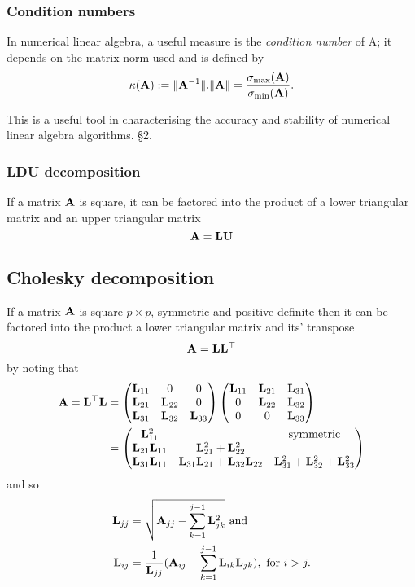 \documentclass{amsart}[12pt]
\begin{document}
\subsubsection{Condition numbers}
In numerical linear algebra, a useful measure is the \emph{condition number} of A; it depends on the matrix
norm used and is defined by
\[
	\kappa({\bf A}) := \|{\bf A}^{-1}\|.\|{\bf A}\| = \frac{\sigma_{\text{max}}({\bf A})}{\sigma_{\text{min}}({\bf A})}.
\]

This is a useful tool in characterising the accuracy and stability of numerical linear algebra algorithms.
\cite{Golub:1996:MC:248979} \S 2.

\subsubsection{LDU decomposition}

If a matrix ${\bf A}$ is square, it can be factored into the product of a lower triangular matrix and an upper 
triangular matrix
\[
	{\bf A} = {\bf L} {\bf U}
\]

\subsection{Cholesky decomposition}

If a matrix ${\bf A}$ is square $p \times p$, symmetric and positive definite then it can be factored into the
product a lower triangular matrix and its' transpose
\[
	{\bf A} = {\bf L} {\bf L}^\top
\]
by noting that
\begin{align*}
	{\bf A} = {\bf L}^\top {\bf L} &= \begin{pmatrix}
		{\bf L}_{11} & 0 & 0 \\
		{\bf L}_{21} & {\bf L}_{22} & 0 \\
		{\bf L}_{31} & {\bf L}_{32} & {\bf L}_{33}
	\end{pmatrix}
	\begin{pmatrix}
		{\bf L}_{11} & {\bf L}_{21} & {\bf L}_{31} \\
		0 & {\bf L}_{22} & {\bf L}_{32} \\
		0 & 0 & {\bf L}_{33}
	\end{pmatrix}	\\
	&= \begin{pmatrix}
	{\bf L}_{11}^2 & & \text{symmetric} \\
	{\bf L}_{21} {\bf L}_{11} & {\bf L}_{21}^2 + {\bf L}_{22}^2 & \\
	{\bf L}_{31} {\bf L}_{11} & {\bf L}_{31} {\bf L}_{21} + {\bf L}_{32} {\bf L}_{22} & {\bf L}_{31}^2 + {\bf L}_{32}^2 + {\bf L}_{33}^2
	\end{pmatrix}
\end{align*}
and so
\begin{align*}
	{\bf L}_{jj} &= \sqrt{{\bf A}_{jj} - \sum_{k=1}^{j-1} {\bf L}_{jk}^2} \text{ and}\\
	{\bf L}_{ij} &= \frac{1}{{\bf L}_{jj}} ({\bf A}_{ij} - \sum_{k=1}^{j-1} {\bf L}_{ik} {\bf L}_{jk}), \text{ for } i > j.
\end{align*}
\end{document}

